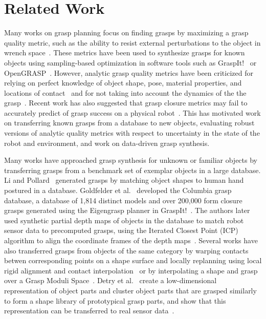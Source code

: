 \section{Related Work}

Many works on grasp planning focus on finding grasps by maximizing a grasp quality metric, such as the ability to resist external perturbations to the object in wrench space~\cite{ferrari1992, miller2004graspit}.
These metrics have been used to synthesize grasps for known objects using sampling-based optimization in software tools such as GraspIt!~\cite{miller2004graspit} or OpenGRASP~\cite{leon2010opengrasp}.
However, analytic grasp quality metrics have been criticized for relying on perfect knowledge of object shape, pose, material properties, and locations of contact~\cite{cheong2011output, diankov2010automated, weisz2012pose, zheng2005} and for not taking into account the dynamics of the the grasp~\cite{bicchi2000robotic, prattichizzo2008grasping}.
Recent work has also suggested that grasp closure metrics may fail to accurately predict of grasp success on a physical robot~\cite{balasubramanian2012physical, weisz2012pose}.
This has motivated work on transferring known grasps from a database to new objects, evaluating robust versions of analytic quality metrics with respect to uncertainty in the state of the robot and environment, and work on data-driven grasp synthesis.

Many works have approached grasp synthesis for unknown or familiar objects by transferring grasps from a benchmark set of exemplar objects in a large database.
Li and Pollard~\cite{li2005shape} generated grasps by matching object shapes to human hand postured in a database.
Goldfelder et al.~\cite{goldfeder2009columbia} developed the Columbia grasp database, a database of 1,814 distinct models and over 200,000 form closure grasps generated using the Eigengrasp planner in GraspIt!~\cite{ciocarlie2009}.
The authors later used synthetic partial depth maps of objects in the database to match robot sensor data to precomputed grasps, using the Iterated Closest Point (ICP) algorithm to align the coordinate frames of the depth maps~\cite{goldfeder2009data, goldfeder2011data}.
Several works have also transferred grasps from objects of the same category by warping contacts betwen corresponding points on a shape surface and locally replanning using local rigid alignment and contact interpolation~\cite{hillenbrand2012transferring, stouraitis2015functional} or by interpolating a shape and grasp over a Grasp Moduli Space~\cite{pokorny2013grasp, pokorny2014grasp}.
Detry et al.~\cite{detry2012generalizing} create a low-dimensional representation of object parts and cluster object parts that are grasped similarly to form a shape library of prototypical grasp parts, and show that this representation can be transferred to real sensor data~\cite{detry2013learning}.


